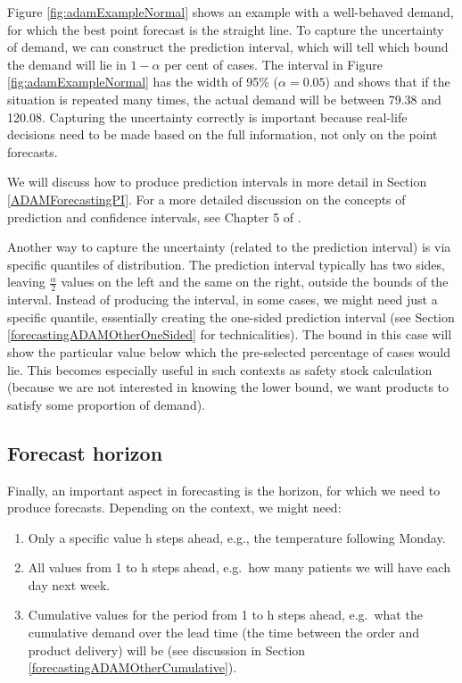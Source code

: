 \documentclass[
]{book}
\providecommand{\tightlist}{%
  \setlength{\itemsep}{0pt}\setlength{\parskip}{0pt}}
\theoremstyle{definition}
\theoremstyle{definition}
\theoremstyle{definition}
\theoremstyle{definition}
\theoremstyle{remark}
\begin{document}
Figure \ref{fig:adamExampleNormal} shows an example with a well-behaved demand, for which the best point forecast is the straight line. To capture the uncertainty of demand, we can construct the prediction interval, which will tell which bound the demand will lie in \(1-\alpha\) per cent of cases. The interval in Figure \ref{fig:adamExampleNormal} has the width of 95\% (\(\alpha=0.05\)) and shows that if the situation is repeated many times, the actual demand will be between 79.38 and 120.08. Capturing the uncertainty correctly is important because real-life decisions need to be made based on the full information, not only on the point forecasts.

We will discuss how to produce prediction intervals in more detail in Section \ref{ADAMForecastingPI}. For a more detailed discussion on the concepts of prediction and confidence intervals, see Chapter 5 of \citet{SvetunkovSBA}.

Another way to capture the uncertainty (related to the prediction interval) is via specific quantiles of distribution. The prediction interval typically has two sides, leaving \(\frac{\alpha}{2}\) values on the left and the same on the right, outside the bounds of the interval. Instead of producing the interval, in some cases, we might need just a specific quantile, essentially creating the one-sided prediction interval (see Section \ref{forecastingADAMOtherOneSided} for technicalities). The bound in this case will show the particular value below which the pre-selected percentage of cases would lie. This becomes especially useful in such contexts as safety stock calculation (because we are not interested in knowing the lower bound, we want products to satisfy some proportion of demand).

\hypertarget{forecast-horizon}{%
\subsection{Forecast horizon}\label{forecast-horizon}}

Finally, an important aspect in forecasting is the horizon, for which we need to produce forecasts. Depending on the context, we might need:

\begin{enumerate}
\def\labelenumi{\arabic{enumi}.}
\tightlist
\item
  Only a specific value h steps ahead, e.g., the temperature following Monday.
\item
  All values from 1 to h steps ahead, e.g.~how many patients we will have each day next week.
\item
  Cumulative values for the period from 1 to h steps ahead, e.g.~what the cumulative demand over the lead time (the time between the order and product delivery) will be (see discussion in Section \ref{forecastingADAMOtherCumulative}).
\end{enumerate}
\end{document}
